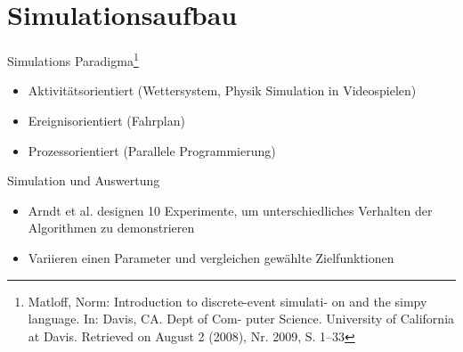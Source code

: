 \documentclass[aspectratio=169,10pt]{beamer}
\begin{document}
\section{Simulationsaufbau}

\begin{frame}[t, fragile]{Simulations Paradigma\footnote{Matloff, Norm: Introduction to discrete-event simulati-
		on and the simpy language. In: Davis, CA. Dept of Com-
		puter Science. University of California at Davis. Retrieved on
		August 2 (2008), Nr. 2009, S. 1–33}}
	\begin{itemize}
		\item Aktivit\"atsorientiert (Wettersystem, Physik Simulation in Videospielen)
		\item \alert{Ereignisorientiert} (Fahrplan)
		\item Prozessorientiert (Parallele Programmierung)
	\end{itemize}
\end{frame}

\begin{frame}[t, fragile]{Simulation und Auswertung}
	\begin{itemize}
		\item Arndt et al. \alert{designen 10 Experimente}, um unterschiedliches Verhalten der Algorithmen zu demonstrieren
		\item Variieren einen Parameter und vergleichen gew\"ahlte Zielfunktionen
	\end{itemize}
\end{frame}
\end{document}
